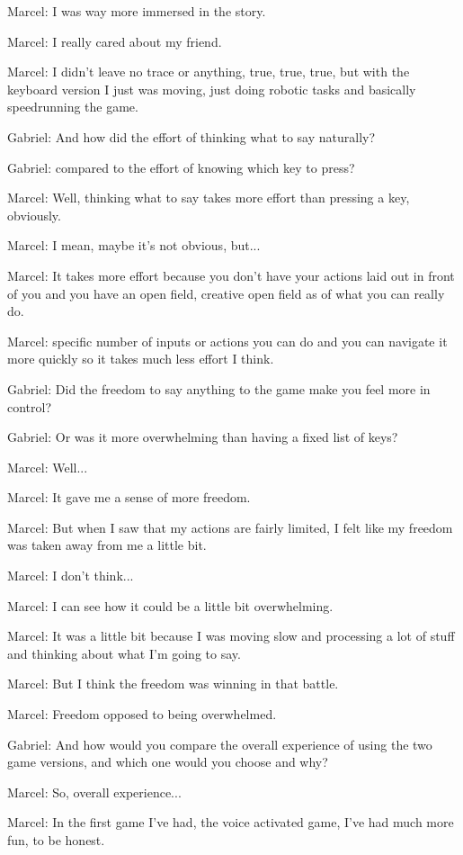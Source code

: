 Marcel: I was way more immersed in the story.

Marcel: I really cared about my friend.

Marcel: I didn't leave no trace or anything, true, true, true, but with the keyboard version I just was moving, just doing robotic tasks and basically speedrunning the game.

Gabriel: And how did the effort of thinking what to say naturally?

Gabriel: compared to the effort of knowing which key to press?

Marcel: Well, thinking what to say takes more effort than pressing a key, obviously.

Marcel: I mean, maybe it's not obvious, but...

Marcel: It takes more effort because you don't have your actions laid out in front of you and you have an open field, creative open field as of what you can really do.

Marcel: specific number of inputs or actions you can do and you can navigate it more quickly so it takes much less effort I think.

Gabriel: Did the freedom to say anything to the game make you feel more in control?

Gabriel: Or was it more overwhelming than having a fixed list of keys?

Marcel: Well...

Marcel: It gave me a sense of more freedom.

Marcel: But when I saw that my actions are fairly limited, I felt like my freedom was taken away from me a little bit.

Marcel: I don't think...

Marcel: I can see how it could be a little bit overwhelming.

Marcel: It was a little bit because I was moving slow and processing a lot of stuff and thinking about what I'm going to say.

Marcel: But I think the freedom was winning in that battle.

Marcel: Freedom opposed to being overwhelmed.

Gabriel: And how would you compare the overall experience of using the two game versions, and which one would you choose and why?

Marcel: So, overall experience...

Marcel: In the first game I've had, the voice activated game, I've had much more fun, to be honest.

